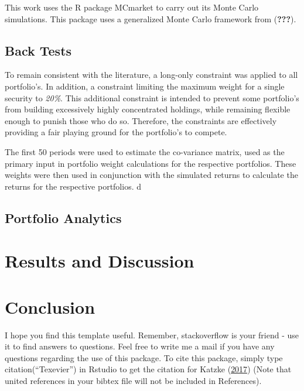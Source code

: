 \documentclass[11pt,preprint, authoryear]{elsarticle}
\numberwithin{equation}{section}
\numberwithin{figure}{section}
\numberwithin{table}{section}
\begin{document}
This work uses the R package MCmarket to carry out its Monte Carlo
simulations. This package uses a generalized Monte Carlo framework from
({\textbf{???}}).

\hypertarget{back-tests}{%
\subsection{Back Tests}\label{back-tests}}

To remain consistent with the literature, a long-only constraint was
applied to all portfolio's. In addition, a constraint limiting the
maximum weight for a single security to \emph{20\%}. This additional
constraint is intended to prevent some portfolio's from building
excessively highly concentrated holdings, while remaining flexible
enough to punish those who do so. Therefore, the constraints are
effectively providing a fair playing ground for the portfolio's to
compete.

The first 50 periods were used to estimate the co-variance matrix, used
as the primary input in portfolio weight calculations for the respective
portfolios. These weights were then used in conjunction with the
simulated returns to calculate the returns for the respective
portfolios. d

\hypertarget{portfolio-analytics}{%
\subsection{Portfolio Analytics}\label{portfolio-analytics}}

\hypertarget{results-and-discussion}{%
\section{Results and Discussion}\label{results-and-discussion}}

\hypertarget{conclusion}{%
\section{Conclusion}\label{conclusion}}

I hope you find this template useful. Remember, stackoverflow is your
friend - use it to find answers to questions. Feel free to write me a
mail if you have any questions regarding the use of this package. To
cite this package, simply type citation(``Texevier'') in Rstudio to get
the citation for Katzke (\protect\hyperlink{ref-Texevier}{2017}) (Note
that united references in your bibtex file will not be included in
References).
\end{document}
